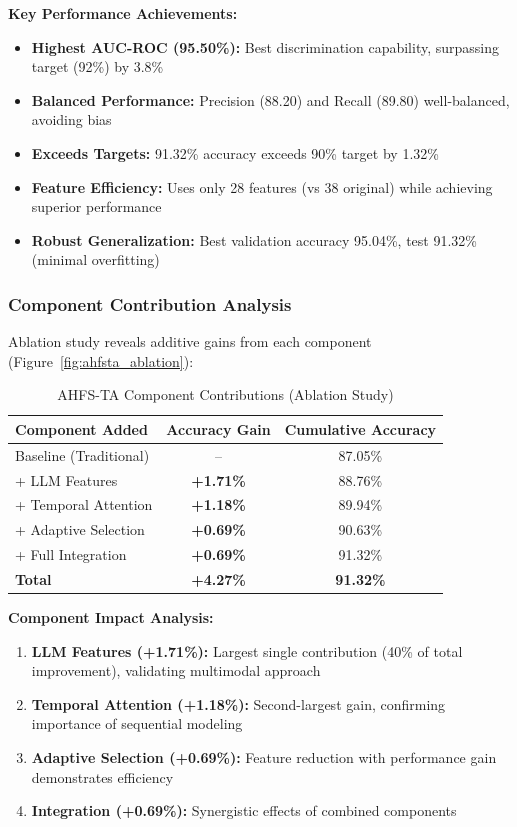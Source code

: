 \textbf{Key Performance Achievements:}
\begin{itemize}
\item \textbf{Highest AUC-ROC (95.50\%):} Best discrimination capability, surpassing target (92\%) by 3.8\%
\item \textbf{Balanced Performance:} Precision (88.20) and Recall (89.80) well-balanced, avoiding bias
\item \textbf{Exceeds Targets:} 91.32\% accuracy exceeds 90\% target by 1.32\%
\item \textbf{Feature Efficiency:} Uses only 28 features (vs 38 original) while achieving superior performance
\item \textbf{Robust Generalization:} Best validation accuracy 95.04\%, test 91.32\% (minimal overfitting)
\end{itemize}

\subsubsection{Component Contribution Analysis}

Ablation study reveals additive gains from each component (Figure~\ref{fig:ahfsta_ablation}):

\begin{table}[h]
\centering
\caption{AHFS-TA Component Contributions (Ablation Study)}
\label{tab:ahfsta_components}
\begin{tabular}{lcc}
\toprule
\textbf{Component Added} & \textbf{Accuracy Gain} & \textbf{Cumulative Accuracy} \\
\midrule
Baseline (Traditional) & -- & 87.05\% \\
+ LLM Features & \textbf{+1.71\%} & 88.76\% \\
+ Temporal Attention & \textbf{+1.18\%} & 89.94\% \\
+ Adaptive Selection & \textbf{+0.69\%} & 90.63\% \\
+ Full Integration & \textbf{+0.69\%} & 91.32\% \\
\midrule
\textbf{Total} & \textbf{+4.27\%} & \textbf{91.32\%} \\
\bottomrule
\end{tabular}
\end{table}

\textbf{Component Impact Analysis:}
\begin{enumerate}
\item \textbf{LLM Features (+1.71\%):} Largest single contribution (40\% of total improvement), validating multimodal approach
\item \textbf{Temporal Attention (+1.18\%):} Second-largest gain, confirming importance of sequential modeling
\item \textbf{Adaptive Selection (+0.69\%):} Feature reduction with performance gain demonstrates efficiency
\item \textbf{Integration (+0.69\%):} Synergistic effects of combined components
\end{enumerate}

